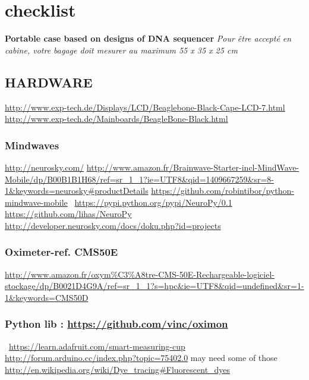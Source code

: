\section{checklist}

\textbf{Portable case based on designs of DNA sequencer}
\textit{{\textquotedbl}Pour \^etre accept\'e en cabine, votre
bagage doit mesurer au maximum 55 x 35 x 25 cm {\textquotedbl}}

\subsection{HARDWARE}

\url{http://www.exp-tech.de/Displays/LCD/Beaglebone-Black-Cape-LCD-7.html}
\url{http://www.exp-tech.de/Mainboards/BeagleBone-Black.html}
~
\subsubsection {Mindwaves}
\url{http://neurosky.com/}
\url{http://www.amazon.fr/Brainwave-Starter-incl-MindWave-Mobile/dp/B00B1B1H68/ref=sr_1_1?ie=UTF8&qid=1409667259&sr=8-1&keywords=neurosky#productDetails}
\url{https://github.com/robintibor/python-mindwave-mobile}
~\url{https://pypi.python.org/pypi/NeuroPy/0.1}
\url{https://github.com/lihas/NeuroPy}
\url{http://developer.neurosky.com/docs/doku.php?id=projects}
~
\subsubsection {Oximeter-ref. CMS50E~}
\href{http://www.amazon.fr/oxym?tre-CMS-50E-Rechargeable-logiciel-stockage/dp/B0021D4G9A/ref=sr_1_1?s=hpc&ie=UTF8&qid=undefined&sr=1-1&keywords=CMS50D}{http://www.amazon.fr/oxym\%C3\%A8tre-CMS-50E-Rechargeable-logiciel-stockage/dp/B0021D4G9A/ref=sr\_1\_1?s=hpc\&ie=UTF8\&qid=undefined\&sr=1-1\&keywords=CMS50D}

\bigskip
\subsubsection {Python lib : \url{https://github.com/vinc/oximon}}

~\url{https://learn.adafruit.com/smart-measuring-cup}
\url{http://forum.arduino.cc/index.php?topic=75402.0}
may need some of those
\url{http://en.wikipedia.org/wiki/Dye_tracing#Fluorescent_dyes}
~
